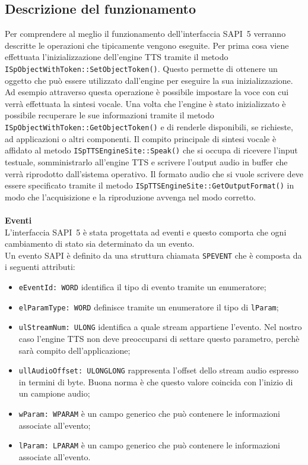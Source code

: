 \subsection{Descrizione del funzionamento}
Per comprendere al meglio il funzionamento dell'interfaccia SAPI~5 verranno descritte le operazioni che tipicamente vengono eseguite.
Per prima cosa viene effettuata l'inizializzazione dell'engine TTS tramite il metodo \texttt{ISpObjectWithToken::SetObjectToken()}. Questo permette di ottenere un oggetto che può essere utilizzato dall'engine per eseguire la sua inizializzazione.
Ad esempio attraverso questa operazione è possibile impostare la voce con cui verrà effettuata la sintesi vocale.
Una volta che l'engine è stato inizializzato è possibile recuperare le sue informazioni tramite il metodo \texttt{ISpObjectWithToken::GetObjectToken()} e di renderle disponibili, se richieste, ad applicazioni o altri componenti.
Il compito principale di sintesi vocale è affidato al metodo \texttt{ISpTTSEngineSite::Speak()} che si occupa di ricevere l'input testuale, somministrarlo all'engine TTS e scrivere l'output audio in buffer che verrà riprodotto dall'sistema operativo.
Il formato audio che si vuole scrivere deve essere specificato tramite il metodo \texttt{ISpTTSEngineSite::GetOutputFormat()} in modo che l'acquisizione e la riproduzione avvenga nel modo corretto.\\\\
\textbf{Eventi}\\
L'interfaccia SAPI~5 è stata progettata ad eventi e questo comporta che ogni cambiamento di stato sia determinato da un evento.\\
Un evento SAPI è definito da una struttura chiamata \texttt{SPEVENT} che è composta da i seguenti attributi:
\begin{itemize}
	\item \texttt{eEventId: WORD} identifica il tipo di evento tramite un enumeratore;
	\item \texttt{elParamType: WORD} definisce tramite un enumeratore il tipo di \texttt{lParam};
	\item \texttt{ulStreamNum: ULONG} identifica a quale stream appartiene l'evento. Nel nostro caso l'engine TTS non deve preoccuparsi di settare questo parametro, perchè sarà compito dell'applicazione;
	\item \texttt{ullAudioOffset: ULONGLONG} rappresenta l'offset dello stream audio espresso in termini di byte. Buona norma è che questo valore coincida con l'inizio di un campione audio;
	\item \texttt{wParam: WPARAM} è un campo generico che può contenere le informazioni associate all'evento;
	\item \texttt{lParam: LPARAM} è un campo generico che può contenere le informazioni associate all'evento.
\end{itemize}
